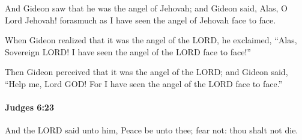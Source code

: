 			\begin{versebox}
					\item[BHS] 
					\item[ASV] And Gideon saw that he was the angel of Jehovah; and Gideon said, Alas, O Lord Jehovah! forasmuch as I have seen the angel of Jehovah face to face.
					\item[NIV] When Gideon realized that it was the angel of the LORD, he exclaimed, “Alas, Sovereign LORD! I have seen the angel of the LORD face to face!”
					\item[NRSV] Then Gideon perceived that it was the angel of the LORD; and Gideon said, “Help me, Lord GOD! For I have seen the angel of the LORD face to face.”
			\end{versebox}

		\paragraph{Judges 6:23} %
			\label{JUDGES-6-23}

			And the LORD said unto him, Peace be unto thee; fear not: thou shalt not die.

